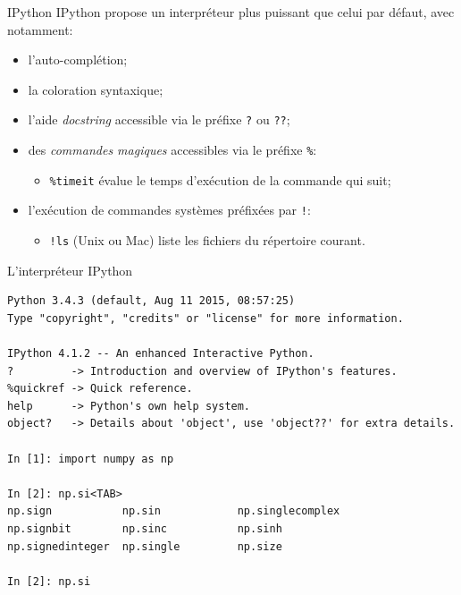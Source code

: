 \documentclass[dvipsnames]{beamer}
\begin{document}
\begin{frame}
    [fragile]{IPython}
    IPython propose un interpréteur plus puissant que celui par défaut, avec
    notamment:
    \begin{itemize}
        \item l'auto-complétion;
        \item la coloration syntaxique;
        \item l'aide \emph{docstring} accessible via le préfixe \verb+?+ ou
              \verb+??+;
        \item des \emph{commandes magiques} accessibles via le préfixe \verb+%+:
              \begin{itemize}
                  \scriptsize
                  \item \texttt{\%timeit} évalue le temps d'exécution de la
                        commande qui suit;
              \end{itemize}
        \item l'exécution de commandes systèmes préfixées par \verb+!+:
              \begin{itemize}
                  \scriptsize
                  \item \texttt{!ls} (Unix ou Mac) liste les fichiers du
                        répertoire courant.
              \end{itemize}
    \end{itemize}
\end{frame}

\begin{frame}
    [fragile]{L'interpréteur IPython}

    \begin{verbatim}
Python 3.4.3 (default, Aug 11 2015, 08:57:25)
Type "copyright", "credits" or "license" for more information.

IPython 4.1.2 -- An enhanced Interactive Python.
?         -> Introduction and overview of IPython's features.
%quickref -> Quick reference.
help      -> Python's own help system.
object?   -> Details about 'object', use 'object??' for extra details.

In [1]: import numpy as np

In [2]: np.si<TAB>
np.sign           np.sin            np.singlecomplex
np.signbit        np.sinc           np.sinh
np.signedinteger  np.single         np.size

In [2]: np.si
\end{verbatim}
\end{frame}
\end{document}
